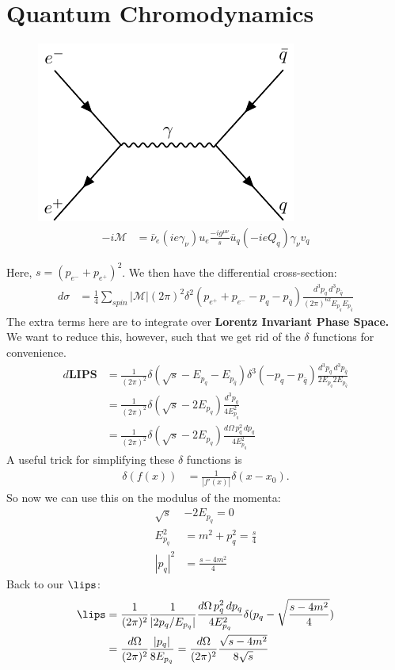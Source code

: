 \documentclass[a4paper, 11pt, normalem]{report}
\begin{document}
\chapter{Quantum Chromodynamics}
\begin{figure}[H]
    \centering
    \includegraphics{epq.pdf}
    \begin{align}
        -i\mathcal{M} &= \bar{\nu}_e(ie\gamma_\nu)u_e\frac{-ig^{\mu\nu}}{s}\bar{u}_q(-ieQ_{q})\gamma_\nu v_q
    \end{align}
    \vspace{-40pt}
\end{figure}
Here, $s = (p_{e^-} + p_{e^+})^2$.
We then have the differential cross-section:
\begin{align}
    d\sigma &= \frac14\sum_{spin} |\mathcal{M}| (2\pi)^2 \delta^2(p_{e^+}+p_{e^-}-p_{q}-p_{\bar{q}}) \frac{d^3p_q\,d^3p_{\bar{q}}}{(2\pi)^62E_{p_q}E_{p_{\bar{q}}}}
\end{align}
The extra terms here are to integrate over \textbf{Lorentz Invariant Phase Space.}
We want to reduce this, however, such that we get rid of the $\delta$ functions for convenience.
\begin{align}
    d\textbf{LIPS} &= \frac{1}{(2\pi)^2} \delta(\sqrt{s}-E_{p_q}-E_{p_{\bar{q}}})\delta^3(-p_{q}-p_{\bar{q}}) \frac{d^3p_q\,d^3p_{\bar{q}}}{2E_{p_q}2E_{p_{\bar{q}}}} \\
                 &= \frac{1}{(2\pi)^2} \delta(\sqrt{s}-2E_{p_q})\frac{d^3p_{q}}{4E_{p_q}^2} \\
                 &= \frac{1}{(2\pi)^2} \delta(\sqrt{s}-2E_{p_q})\frac{d\Omega\,p_q^2\,dp_q}{4E_{p_q}^2}
\end{align}
A useful trick for simplifying these $\delta$ functions is
\begin{align}
    \delta(f(x)) &= \frac{1}{|f'(x)|}\delta(x-x_0).
\end{align}
So now we can use this on the modulus of the momenta:
\begin{align}
    \sqrt{s} &- 2E_{p_q} = 0 \\
    E_{p_q}^2 &= m^2 + p_q^2 = \frac{s}{4} \\
    |p_q|^2 &= \frac{s-4m^2}{4}
\end{align}
Back to our $\lips$:
\begin{align}
    \lips &= \frac{1}{(2\pi)^2} \frac{1}{|2p_q/E_{p_q}|} \frac{d\Omega\, p_q^2\,dp_q}{4E_{p_q}^2} \delta(p_q-\sqrt{\frac{s-4m^2}{4}}) \\
          &= \frac{d\Omega}{(2\pi)^2}\frac{|p_q|}{8E_{p_q}} = \frac{d\Omega}{(2\pi)^2}\frac{\sqrt{s-4m^2}}{8\sqrt{s}}
\end{align}
\end{document}
